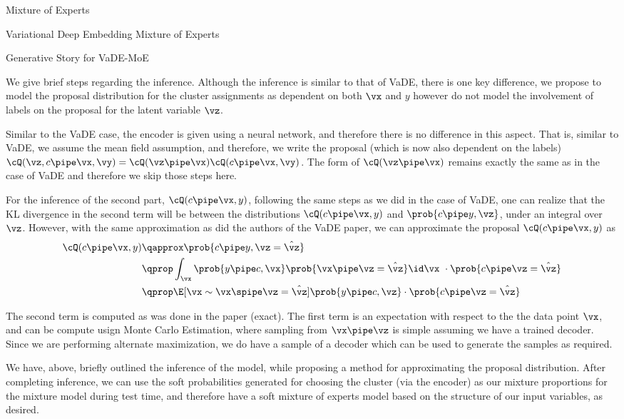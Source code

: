 \documentclass{article}
\begin{document}
\begin{psection}{Mixture of Experts}
\begin{psubsection}{Variational Deep Embedding Mixture of Experts}
\begin{algo}[0.8\textwidth]{Generative Story for VaDE-MoE}
		\end{algo}

		We give brief steps regarding the inference. Although the inference is similar to that of VaDE, there is one key difference, we propose to model the proposal distribution for the cluster assignments as dependent on both $\vx$ and $y$ however do not model the involvement of labels on the proposal for the latent variable $\vz$.

		Similar to the VaDE case, the encoder is given using a neural network, and therefore there is no difference in this aspect. That is, similar to VaDE, we assume the mean field assumption, and therefore, we write the proposal (which is now also dependent on the labels) $\cQ(\vz, c \pipe \vx, \vy) = \cQ(\vz \pipe \vx) \cQ(c \pipe \vx, \vy)$. The form of $\cQ(\vz \pipe \vx)$ remains exactly the same as in the case of VaDE and therefore we skip those steps here.

		For the inference of the second part, \ie $\cQ(c \pipe \vx, y)$, following the same steps as we did in the case of VaDE, one can realize that the KL divergence in the second term will be between the distributions $\cQ(c \pipe \vx, y)$ and $\prob{c \pipe y, \vz}$, under an integral over $\vz$. However, with the same approximation as did the authors of the VaDE paper, we can approximate the proposal $\cQ(c \pipe \vx, y)$ as
		\begin{align*}
			\cQ(c \pipe \vx, y) &\qapprox \prob{c \pipe y, \vz = \hat{\vz}} \\
			&\qprop \int_{\vx} \prob{y \pipe c, \vx} \prob{\vx \pipe \vz = \hat{\vz}} \id \vx\ \cdot \prob{c \pipe \vz = \hat{\vz}} \\
			&\qprop \E[\vx \sim \vx \spipe \vz = \hat{\vz}]{\prob{y \pipe c, \vz}} \cdot \prob{c \pipe \vz = \hat{\vz}}
		\end{align*}

		The second term is computed as was done in the paper (exact). The first term is an expectation with respect to the the data point $\vx$, and can be compute usign Monte Carlo Estimation, where sampling from $\vx \pipe \vz$ is simple assuming we have a trained decoder. Since we are performing alternate maximization, we do have a sample of a decoder which can be used to generate the samples as required.

		We have, above, briefly outlined the inference of the model, while proposing a method for approximating the proposal distribution. After completing inference, we can use the soft probabilities generated for choosing the cluster (via the encoder) as our mixture proportions for the mixture model during test time, and therefore have a soft mixture of experts model based on the structure of our input variables, as desired.

	\end{psubsection}
\end{psection}
\end{document}

